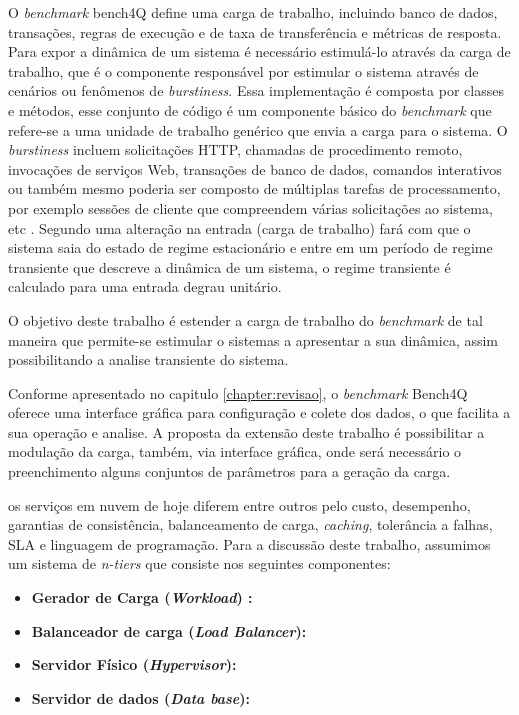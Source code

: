 O \textit{benchmark} bench4Q define uma carga de trabalho, incluindo banco de dados, transações, regras de execução e de taxa de transferência e métricas de resposta.  Para expor a dinâmica de um sistema é necessário estimulá-lo através da carga de trabalho, que é o componente responsável por estimular o sistema através de cenários ou fenômenos de \textit{burstiness}. Essa implementação é composta por classes e métodos, esse conjunto de código é um componente básico do \textit{benchmark} que refere-se a uma unidade de trabalho genérico que envia a carga para o sistema. O \textit{burstiness} incluem solicitações HTTP, chamadas de procedimento remoto, invocações de serviços Web, transações de banco de dados, comandos interativos ou também mesmo poderia ser composto de múltiplas tarefas de processamento, por exemplo sessões de cliente que compreendem várias solicitações ao sistema, etc \cite{Kounev2005}. Segundo \cite{Nobile2013} uma alteração na entrada (carga de trabalho) fará com que o sistema saia do estado de regime estacionário e entre em um período de regime transiente que descreve a dinâmica de um sistema, o regime transiente é calculado para uma entrada degrau unitário.

O objetivo deste trabalho é estender a carga de trabalho do \textit{benchmark} de tal maneira que permite-se estimular o sistemas a apresentar a sua dinâmica, assim possibilitando a analise transiente do sistema. 

Conforme apresentado no capitulo \ref{chapter:revisao}, o \textit{benchmark} Bench4Q oferece uma interface gráfica para configuração e colete dos dados, o que facilita a sua operação e analise. A proposta da extensão deste trabalho é possibilitar a modulação da carga, também, via interface gráfica, onde será necessário o preenchimento alguns conjuntos de parâmetros para a geração da carga.

\cite{Binnig2009} os serviços em nuvem de hoje diferem entre outros pelo custo, desempenho, garantias de consistência, balanceamento de carga, \textit{caching}, tolerância a falhas, SLA e linguagem de programação. Para a discussão deste trabalho, assumimos um sistema de \textit{n-tiers} que consiste nos seguintes componentes:

\begin{itemize}
	\item \textbf{Gerador de Carga (\textit{Workload}) :}
	\item \textbf{Balanceador de carga (\textit{Load Balancer}):}
	\item \textbf{Servidor Físico (\textit{Hypervisor}):}
	\item \textbf{Servidor de dados (\textit{Data base}):}
\end{itemize}

